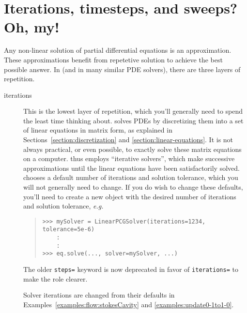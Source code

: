     \section{Iterations, timesteps, and sweeps? Oh, my!} 
    \label{FAQ-IterationsTimestepsSweeps}
    Any non-linear solution of partial differential equations is an
    approximation. These approximations benefit from repetetive
    solution to achieve the best possible answer. In \FiPy{} (and in
    many similar PDE solvers), there are three layers of repetition.
    
    \begin{description}
    
        \item[iterations] This is the lowest layer of repetition,
        which you'll generally need to spend the least time thinking
        about. \FiPy{} solves PDEs by discretizing them into a set of
        linear equations in matrix form, as explained in
        Sections~\ref{section:discretization} and
        \ref{section:linear-equations}. It is not always practical, or
        even possible, to exactly solve these matrix equations on a
        computer. \FiPy{} thus employs ``iterative solvers'', which
        make successive approximations until the linear equations have
        been satisfactorily solved. \FiPy{} chooses a default number
        of iterations and solution tolerance, which you will not
        generally need to change. If you do wish to change these
        defaults, you'll need to create a new  object
        with the desired number of iterations and solution tolerance,
        \emph{e.g.}
        \begin{quote}
\begin{verbatim}
>>> mySolver = LinearPCGSolver(iterations=1234, tolerance=5e-6) 
    : 
    :
>>> eq.solve(..., solver=mySolver, ...)
\end{verbatim}
    	\end{quote}
        \begin{reSTadmonition}[Note]
        The older  \verb+steps=+ keyword is now
        deprecated in favor of \verb+iterations=+ to make the role
        clearer.
        \end{reSTadmonition}
        Solver iterations are changed from their defaults in
        Examples~\ref{examples:flow:stokesCavity} and
        \ref{examples:update0-1to1-0}.
        

\end{description}
